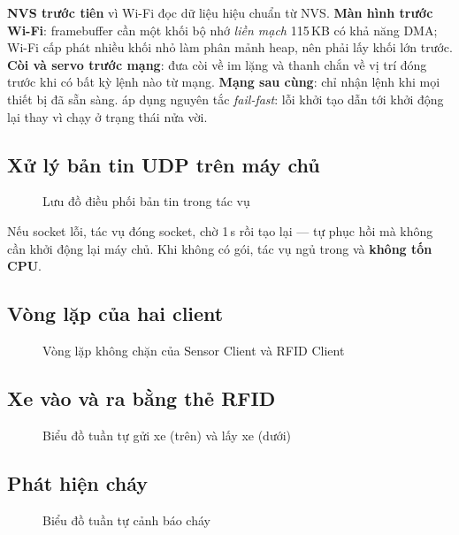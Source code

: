 \newpage
\begin{lydo}
\textbf{NVS trước tiên} vì Wi-Fi đọc dữ liệu hiệu chuẩn từ NVS. \textbf{Màn hình
trước Wi-Fi}: framebuffer cần một khối bộ nhớ \emph{liền mạch} 115\,KB có khả năng
DMA; Wi-Fi cấp phát nhiều khối nhỏ làm phân mảnh heap, nên phải lấy khối lớn trước.
\textbf{Còi và servo trước mạng}: đưa còi về im lặng và thanh chắn về vị trí đóng
trước khi có bất kỳ lệnh nào từ mạng. \textbf{Mạng sau cùng}: chỉ nhận lệnh khi mọi
thiết bị đã sẵn sàng.  áp dụng nguyên tắc \emph{fail-fast}:
lỗi khởi tạo dẫn tới khởi động lại thay vì chạy ở trạng thái nửa vời.
\end{lydo}

\subsection{Xử lý bản tin UDP trên máy chủ}
\begin{figure}[H]
\centering
{}
\caption{Lưu đồ điều phối bản tin trong tác vụ }\label{fig:udpflow}
\end{figure}
Nếu socket lỗi, tác vụ đóng socket, chờ 1\,s rồi tạo lại — tự phục hồi mà không cần
khởi động lại máy chủ. Khi không có gói, tác vụ ngủ trong  và
\textbf{không tốn CPU}.

\subsection{Vòng lặp của hai client}
\begin{figure}[H]
\centering
{}
\caption{Vòng lặp không chặn của Sensor Client và RFID Client}\label{fig:clientloops}
\end{figure}

\subsection{Xe vào và ra bằng thẻ RFID}
\begin{figure}[H]
\centering
{}
\caption{Biểu đồ tuần tự gửi xe (trên) và lấy xe (dưới)}\label{fig:seq-rfid}
\end{figure}

\subsection{Phát hiện cháy}
\begin{figure}[H]
\centering
{}
\caption{Biểu đồ tuần tự cảnh báo cháy}\label{fig:seq-fire}
\end{figure}

